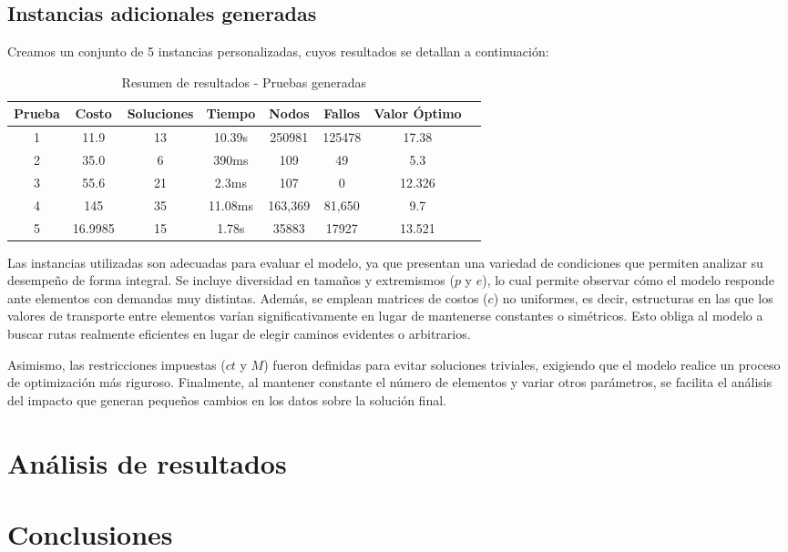 \subsection{Instancias adicionales generadas}

Creamos un conjunto de 5 instancias personalizadas, cuyos resultados se detallan a continuación:

\begin{table}[H]
	\centering
	\caption{Resumen de resultados - Pruebas generadas}
	\begin{tabular}{|c|c|c|c|c|c|c|c|}
		\hline
		\rowcolor{gray!30}
		\textbf{Prueba} & \textbf{Costo} & \textbf{Soluciones} & \textbf{Tiempo} & \textbf{Nodos} & \textbf{Fallos} & \textbf{Valor Óptimo} \\
		\hline
		1   &  11.9 & 13   & 10.39s  & 250981   & 125478   & 17.38 \\
		2     & 35.0  &  6 & 390ms  &  109 & 49  & 5.3 \\
		3   &  55.6 &  21  & 2.3ms &  107  & 0 & 12.326 \\
		4   & 145 & 35  & 11.08ms  & 163,369 & 81,650  & 9.7 \\
		5  & 16.9985 & 15 & 1.78s  & 35883 &  17927  & 13.521 \\
		\hline
	\end{tabular}
\end{table}

Las instancias utilizadas son adecuadas para evaluar el modelo, ya que presentan una variedad de condiciones que permiten analizar su desempeño de forma integral. Se incluye diversidad en tamaños y extremismos ($p$ y $e$), lo cual permite observar cómo el modelo responde ante elementos con demandas muy distintas. Además, se emplean matrices de costos ($c$) no uniformes, es decir, estructuras en las que los valores de transporte entre elementos varían significativamente en lugar de mantenerse constantes o simétricos. Esto obliga al modelo a buscar rutas realmente eficientes en lugar de elegir caminos evidentes o arbitrarios.

Asimismo, las restricciones impuestas ($ct$ y $M$) fueron definidas para evitar soluciones triviales, exigiendo que el modelo realice un proceso de optimización más riguroso. Finalmente, al mantener constante el número de elementos y variar otros parámetros, se facilita el análisis del impacto que generan pequeños cambios en los datos sobre la solución final.

\section{Análisis de resultados}

\section{Conclusiones}


